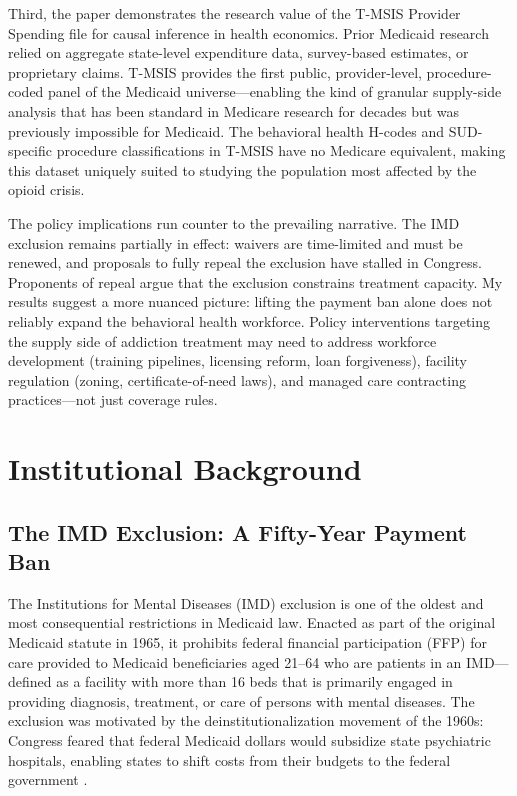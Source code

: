\documentclass[12pt]{article}
\begin{document}
Third, the paper demonstrates the research value of the T-MSIS Provider Spending file for causal inference in health economics. Prior Medicaid research relied on aggregate state-level expenditure data, survey-based estimates, or proprietary claims. T-MSIS provides the first public, provider-level, procedure-coded panel of the Medicaid universe---enabling the kind of granular supply-side analysis that has been standard in Medicare research for decades but was previously impossible for Medicaid. The behavioral health H-codes and SUD-specific procedure classifications in T-MSIS have no Medicare equivalent, making this dataset uniquely suited to studying the population most affected by the opioid crisis.

The policy implications run counter to the prevailing narrative. The IMD exclusion remains partially in effect: waivers are time-limited and must be renewed, and proposals to fully repeal the exclusion have stalled in Congress. Proponents of repeal argue that the exclusion constrains treatment capacity. My results suggest a more nuanced picture: lifting the payment ban alone does not reliably expand the behavioral health workforce. Policy interventions targeting the supply side of addiction treatment may need to address workforce development (training pipelines, licensing reform, loan forgiveness), facility regulation (zoning, certificate-of-need laws), and managed care contracting practices---not just coverage rules.

\section{Institutional Background}

\subsection{The IMD Exclusion: A Fifty-Year Payment Ban}

The Institutions for Mental Diseases (IMD) exclusion is one of the oldest and most consequential restrictions in Medicaid law. Enacted as part of the original Medicaid statute in 1965, it prohibits federal financial participation (FFP) for care provided to Medicaid beneficiaries aged 21--64 who are patients in an IMD---defined as a facility with more than 16 beds that is primarily engaged in providing diagnosis, treatment, or care of persons with mental diseases. The exclusion was motivated by the deinstitutionalization movement of the 1960s: Congress feared that federal Medicaid dollars would subsidize state psychiatric hospitals, enabling states to shift costs from their budgets to the federal government \citep{frank2000medicaid}.
\end{document}
